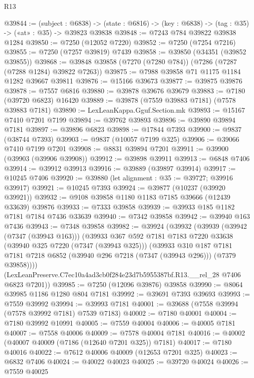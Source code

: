 \begin{lexlean}{R13}
\begin{coremodule}
@39844 := (subject : @6838) ->
  (state : @6816) -> (key : @6838) -> (tag : @35) -> («at» : @35) -> @39823 @39838
@39848 := @7243 @784 @39822 @39838 @1284
@39850 := @7250 (@12052 @7220)
@39852 := @7250 (@7254 @7216)
@39855 := @7250 (@7257 @39819) @7439
@39858 := @39850 (@34351 (@39852 @39855))
@39868 := @39848 @39858 (@7270 (@7280 @784)) (@7286 (@7287 (@7288 @1284) @39822 @7263))
@39875 := @7988 @39858 @71 @1175 @1184 @1282 @39667 @39811
@39876 := @15166 @39673
@39877 := @39875 @39876
@39878 := @7557 @6816
@39880 := @39878 @39676 @39679
@39883 := @7180 (@39720 @6823) @16420
@39889 := @39878 (@7559 @39883 @7181) (@7578 @39883 @7181)
@39890 := LexLeanKappa.Gguf.Section.mk
@39893 := @15167 @7410 @7201 @7199
@39894 := @39762 @39893
@39896 := @39890 @39894 @7181
@39897 := @39896 @6823
@39898 := @17844 @7393
@39900 := @9837 (@38744 @7393)
@39903 := @9837 (@10057 @7199 @325)
@39906 := @39066 @7410 @7199 @7201
@39908 := @8831 @39894 @7201
@39911 := @39900 (@39903 (@39906 @39908))
@39912 := @39898 @39911
@39913 := @6848 @7406
@39914 := @39912 @39913
@39916 := @39889 (@39897 @39914)
@39917 := @10245 @7406
@39920 := @39880 (let alignment : @35 := @39727; @39916 @39917)
@39921 := @10245 @7393
@39924 := @39877 (@10237 (@39920 @39921))
@39932 := @9108 @39858 @1180 @1183 @7185 @39666 (@12439 @33639) @39876
@39933 := @7333 @39858
@39939 := @39933 @185 @1182 @7181 @7184 @7436 @33639
@39940 := @7342 @39858
@39942 := @39940 @163 @7436
@39943 := @7348 @39858
@39982 := @39924
    (@39932
      (@39939
        (@39942 (@7347 (@39943 @163)))
        (@39933
          @367
          @592
          @7181
          @7183
          @7220
          @33638
          (@39940 @325 @7220 (@7347 (@39943 @325)))
          (@39933
            @310
            @187
            @7181
            @7181
            @7218
            @6852
            (@39940 @296 @7218 (@7347 (@39943 @296)))
            (@7379 @39858))))
      (LexLeanPreserve.C7ec10a4ad3cb0f284e23d7b5955387bf.R13.__rel_28 @7406 @6823 @7201))
@39985 := @7250 (@12096 @39876) @39858
@39990 := @8064 @39985 @1186 @1280 @804 @7181
@39992 := @39691 @7393 @39693
@39993 := @7559 @39992
@39994 := @39993 @7181
@40001 := @39688 (@7558 @39994 (@7578 @39992 @7181) @7539 @7183)
@40002 := @7180 @40001
@40004 := @7180 @39992 @10991
@40005 := @7559 @40004
@40006 := @40005 @7181
@40007 := @7558 @40006
@40009 := @7578 @40004 @7181
@40016 := @40002 (@40007 @40009 (@7186 (@12640 @7201 @325)) @7181)
@40017 := @7180 @40016
@40022 := @7612 @40006 @40009 (@12653 @7201 @325)
@40023 := @6832 @7406
@40024 := @40022 @40023
@40025 := @39720 @40024
@40026 := @7559 @40025

\end{coremodule}
\end{lexlean}
